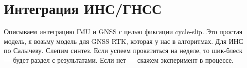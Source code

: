 \section {Интеграция ИНС/ГНСС}
Описываем интеграцию IMU и GNSS с целью фиксации cycle-slip. Это простая модель, я возьму модель для GNSS RTK, которая у нас в алгоритмах. Для ИНС по Салычеву.  
Слепим синтез. Если успеем прокатиться на неделе, то шик-блеск --- будет раздел с результатами. Если нет --- скажем эксперимент в процессе. 